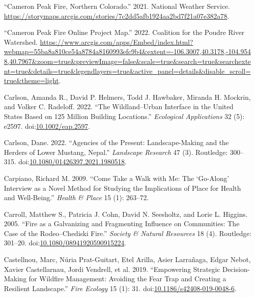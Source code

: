 \documentclass[
]{article}
\newlength{\cslhangindent}
\newenvironment{CSLReferences}[2] %
 {\begin{list}{}{%
  \setlength{\itemindent}{0pt}
  \setlength{\leftmargin}{0pt}
  \setlength{\parsep}{0pt}
  \ifodd #1
   \setlength{\leftmargin}{\cslhangindent}
   \setlength{\itemindent}{-1\cslhangindent}
  \fi
  \setlength{\itemsep}{#2\baselineskip}}}
 {\end{list}}
\begin{document}
\begin{CSLReferences}{1}{0}
{``Cameron {Peak Fire}, {Northern Colorado}.''} 2021. National Weather Service. \url{https://storymaps.arcgis.com/stories/7c2dd5afb1924aa2bd7f21a07e382a78}.

{``Cameron {Peak Fire Online Project Map}.''} 2022. Coalition for the Poudre River Watershed. \url{https://www.arcgis.com/apps/Embed/index.html?webmap=55ba8a810ce54a8784a8160993efc9b4&extent=-106.3007,40.3178,-104.9548,40.7967&zoom=true&previewImage=false&scale=true&search=true&searchextent=true&details=true&legendlayers=true&active_panel=details&disable_scroll=true&theme=light}.

Carlson, Amanda R., David P. Helmers, Todd J. Hawbaker, Miranda H. Mockrin, and Volker C. Radeloff. 2022. {``The Wildland--Urban Interface in the {United States} Based on 125 Million Building Locations.''} \emph{Ecological Applications} 32 (5): e2597. doi:\href{https://doi.org/10.1002/eap.2597}{10.1002/eap.2597}.

Carlson, Dane. 2022. {``Agencies of the Present: Landscape-Making and the Herders of Lower {Mustang}, {Nepal}.''} \emph{Landscape Research} 47 (3). Routledge: 300--315. doi:\href{https://doi.org/10.1080/01426397.2021.1980518}{10.1080/01426397.2021.1980518}.

Carpiano, Richard M. 2009. {``Come Take a Walk with Me: {The} {`{Go-Along}'} Interview as a Novel Method for Studying the Implications of Place for Health and Well-Being.''} \emph{Health \& Place} 15 (1): 263--72.

Carroll, Matthew S., Patricia J. Cohn, David N. Seesholtz, and Lorie L. Higgins. 2005. {``Fire as a {Galvanizing} and {Fragmenting Influence} on {Communities}: {The Case} of the {Rodeo}--{Chediski Fire}.''} \emph{Society \& Natural Resources} 18 (4). Routledge: 301--20. doi:\href{https://doi.org/10.1080/08941920590915224}{10.1080/08941920590915224}.

Castellnou, Marc, Núria Prat-Guitart, Etel Arilla, Asier Larrañaga, Edgar Nebot, Xavier Castellarnau, Jordi Vendrell, et al. 2019. {``Empowering Strategic Decision-Making for Wildfire Management: Avoiding the Fear Trap and Creating a Resilient Landscape.''} \emph{Fire Ecology} 15 (1): 31. doi:\href{https://doi.org/10.1186/s42408-019-0048-6}{10.1186/s42408-019-0048-6}.


\end{CSLReferences}
\end{document}
